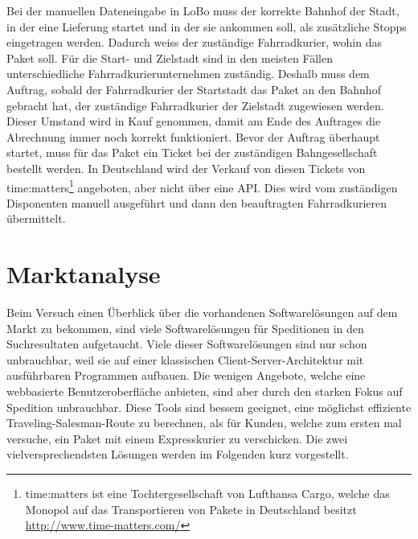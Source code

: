 Bei der manuellen Dateneingabe in LoBo muss der korrekte Bahnhof der Stadt, in der eine Lieferung startet und in der sie ankommen soll, als zusätzliche Stopps eingetragen werden. Dadurch weiss der zuständige Fahrradkurier, wohin das Paket soll. Für die Start- und Zielstadt sind in den meisten Fällen unterschiedliche Fahrradkurierunternehmen zuständig. Deshalb muss dem Auftrag, sobald der Fahrradkurier der Startstadt das Paket an den Bahnhof gebracht hat, der zuständige Fahrradkurier der Zielstadt zugewiesen werden. Dieser Umstand wird in Kauf genommen, damit am Ende des Auftrages die Abrechnung immer noch korrekt funktioniert. Bevor der Auftrag überhaupt startet, muss für das Paket ein Ticket bei der zuständigen Bahngesellschaft bestellt werden. In Deutschland wird der Verkauf von diesen Tickets von time:matters\footnote{time:matters ist eine Tochtergesellschaft von Lufthansa Cargo, welche das Monopol auf das Transportieren von Pakete in Deutschland besitzt \url{http://www.time-matters.com/}} angeboten, aber nicht über eine API. Dies wird vom zuständigen Disponenten manuell ausgeführt und dann den beauftragten Fahrradkurieren übermittelt.


\section{Marktanalyse}
Beim Versuch einen Überblick über die vorhandenen Softwarelösungen auf dem Markt zu bekommen, sind viele Softwarelösungen für Speditionen in den Suchresultaten aufgetaucht. Viele dieser Softwarelösungen sind nur schon unbrauchbar, weil sie auf einer klassischen Client-Server-Architektur mit ausführbaren Programmen aufbauen. Die wenigen Angebote, welche eine webbasierte Benutzeroberfläche anbieten, sind aber durch den starken Fokus auf Spedition unbrauchbar. Diese Tools sind bessem geeignet, eine möglichst effiziente Traveling-Salesman-Route zu berechnen, als für Kunden, welche zum ersten mal versuche, ein Paket mit einem Expresskurier zu verschicken. Die zwei vielversprechendsten Lösungen werden im Folgenden kurz vorgestellt.

